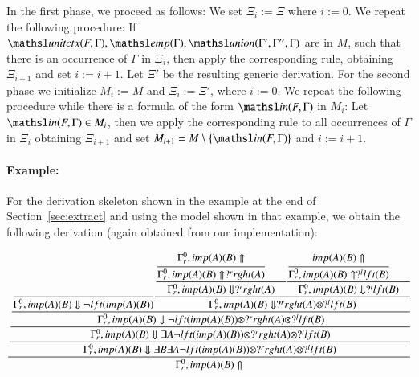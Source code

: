\documentclass{ebl}
\newcommand{\elin}[2]{\ensuremath{{\tsl{unitctx}(\ensuremath{#1}, \ensuremath{#2})}}}
\newcommand{\emp}[1]{\ensuremath{{\tsl{emp}(\ensuremath{#1})}}}
\newcommand{\union}[3]{\ensuremath{{\tsl{union}(\ensuremath{#1},\ensuremath{#2},\ensuremath{ #3})}}}
\newcommand{\In}[2]{\ensuremath{\tsl{in}(\ensuremath{#1},\ensuremath{#2})}}
\begin{document}
In the first phase, we proceed as follows: We set $\Xi_i := \Xi$ where $ i := 0$.
We repeat the following procedure: If 
$\elin{F}{\Gamma}, \emp{\Gamma}, \union{\Gamma'}{\Gamma''}{\Gamma}$ are in $M$, such 
that there is an occurrence of $\Gamma$ in $\Xi_i$, then apply the corresponding 
rule, obtaining $\Xi_{i+1}$ and set $i := i + 1$. 
Let $\Xi'$ be the resulting generic derivation.
For the second phase we initialize $M_i := M$ and $\Xi_i := \Xi'$, where $i := 0$. We repeat 
the following procedure while there is a formula of the form $\In{F}{\Gamma}$ in $M_i$:
Let $\In{F}{\Gamma} \in M_i$, then we apply the corresponding rule to all occurrences of $\Gamma$ in $\Xi_i$
obtaining $\Xi_{i+1}$ and set $M_{i+1} = M \setminus \{\In{F}{\Gamma}\}$  and $i := i + 1$.

\paragraph{Example:}
For the derivation skeleton shown in the example at the end of 
Section~\ref{sec:extract} and using the model shown in that example, we obtain the following derivation (again
obtained from our implementation):

{\small\[\cfrac{\cfrac{\cfrac{\cfrac{\cfrac{}
{\Gamma_{r}^{0}, imp (A) (B)  \Downarrow \neg lft (imp (A) (B) )  }
\cfrac{\cfrac{\cfrac{\Gamma_{r}^{0}, imp (A) (B) \Uparrow }
{\Gamma_{r}^{0}, imp (A) (B) \Uparrow  ?^{r} rght (A)  } \qquad}
{\Gamma_{r}^{0}, imp (A) (B)  \Downarrow  ?^{r} rght (A)   }
\cfrac{\cfrac{imp (A) (B) \Uparrow }
{\Gamma_{r}^{0}, imp (A) (B) \Uparrow  ?^{l} lft (B)   }\qquad}
{\Gamma_{r}^{0}, imp (A) (B) \Downarrow  ?^{l} lft (B)   }}
{\Gamma_{r}^{0}, imp (A) (B) \Downarrow  ?^{r} rght (A)  \otimes  ?^{l} lft (B)  }}
{\Gamma_{r}^{0}, imp (A) (B) \Downarrow \neg lft (imp (A) (B) )  \otimes  ?^{r} rght (A)  \otimes  ?^{l} lft (B)   }}
{\Gamma_{r}^{0}, imp (A) (B) \Downarrow \exists A \neg lft (imp (A) (B) )  \otimes  ?^{r} rght (A)  \otimes  ?^{l} lft (B)   }}
{\Gamma_{r}^{0}, imp (A) (B) \Downarrow \exists B \exists A \neg lft (imp (A) (B) )  \otimes  ?^{r} rght (A)  \otimes  ?^{l} lft (B)   }}
{\Gamma_{r}^{0}, imp (A) (B) \Uparrow }\]}
\end{document}
